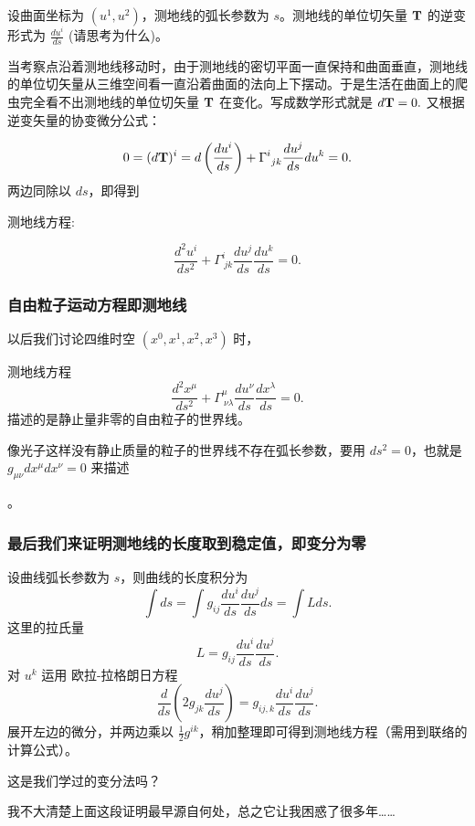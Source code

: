 \documentclass[CJK,13pt]{beamer}
\begin{document}
\begin{frame}
  设曲面坐标为 $(u^1, u^2)$，测地线的弧长参数为 $s$。测地线的单位切矢量 ${\mathbf{T}}$ 的逆变形式为 $\frac{du^i}{ds}$ (请思考为什么)。

  
  当考察点沿着测地线移动时，由于测地线的密切平面一直保持和曲面垂直，测地线的单位切矢量从三维空间看一直沿着曲面的法向上下摆动。于是生活在曲面上的爬虫完全看不出测地线的单位切矢量 ${\mathbf{T}}$ 在变化。写成数学形式就是 $d{\mathbf{T}} = 0.$ 又根据逆变矢量的协变微分公式：

  $$0 = (d{\mathbf{T}})^i = d \left(\frac{du^i}{ds}\right) + \Gamma^i_{\ jk}\frac{du^j}{ds} du^k = 0. $$
  两边同除以 $ds$，即得到{\blue 测地线方程:

  $$\frac{d^2u^i}{ds^2} + \Gamma^i_{\ jk}\frac{du^j}{ds}\frac{du^k}{ds} = 0.$$}
   
\end{frame}


\begin{frame}
  \frametitle{自由粒子运动方程即测地线}
  以后我们讨论四维时空 $(x^0, x^1, x^2, x^3)$ 时，{\blue 测地线方程
  $$\frac{d^2x^\mu}{ds^2} + \Gamma^\mu_{\ \nu\lambda}\frac{du^\nu}{ds}\frac{dx^\lambda}{ds} = 0.$$
    描述的是静止量非零的自由粒子的世界线。


    像光子这样没有静止质量的粒子的世界线不存在弧长参数，要用 $ds^2=0$，也就是 $g_{\mu\nu}dx^\mu dx^\nu=0$ 来描述}。
\end{frame}


\begin{frame}
  \frametitle{最后我们来证明测地线的长度取到稳定值，即变分为零}
  设曲线弧长参数为 $s$，则曲线的长度积分为
  $$ \int ds = \int g_{ij}\frac{du^i}{ds}\frac{du^j}{ds}  ds = \int L ds.$$
  这里的拉氏量
  $$L = g_{ij}\frac{du^i}{ds}\frac{du^j}{ds} .$$
  对 $u^k$ 运用 欧拉-拉格朗日方程
  $$\frac{d}{ds}\left(2g_{jk}\frac{du^j}{ds}\right) = g_{ij, k}\frac{du^i}{ds}\frac{du^j}{ds}.$$
  展开左边的微分，并两边乘以 $\frac{1}{2}g^{ik}$，稍加整理即可得到测地线方程（需用到联络的计算公式）。
\end{frame}


\begin{frame}

  这是我们学过的变分法吗？
  
  
  我不大清楚上面这段证明最早源自何处，总之它让我困惑了很多年……
\end{frame}


\ech
\end{document}
